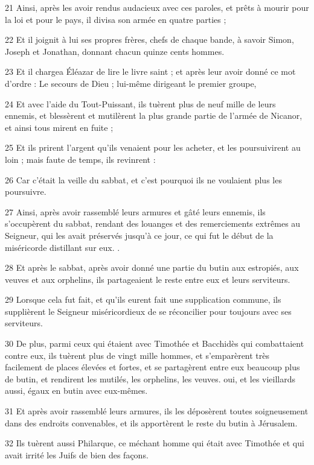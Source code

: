 \par 21 Ainsi, après les avoir rendus audacieux avec ces paroles, et prêts à mourir pour la loi et pour le pays, il divisa son armée en quatre parties ;
\par 22 Et il joignit à lui ses propres frères, chefs de chaque bande, à savoir Simon, Joseph et Jonathan, donnant chacun quinze cents hommes.
\par 23 Et il chargea Éléazar de lire le livre saint ; et après leur avoir donné ce mot d'ordre : Le secours de Dieu ; lui-même dirigeant le premier groupe,
\par 24 Et avec l'aide du Tout-Puissant, ils tuèrent plus de neuf mille de leurs ennemis, et blessèrent et mutilèrent la plus grande partie de l'armée de Nicanor, et ainsi tous mirent en fuite ;
\par 25 Et ils prirent l'argent qu'ils venaient pour les acheter, et les poursuivirent au loin ; mais faute de temps, ils revinrent :
\par 26 Car c'était la veille du sabbat, et c'est pourquoi ils ne voulaient plus les poursuivre.
\par 27 Ainsi, après avoir rassemblé leurs armures et gâté leurs ennemis, ils s'occupèrent du sabbat, rendant des louanges et des remerciements extrêmes au Seigneur, qui les avait préservés jusqu'à ce jour, ce qui fut le début de la miséricorde distillant sur eux. .
\par 28 Et après le sabbat, après avoir donné une partie du butin aux estropiés, aux veuves et aux orphelins, ils partageaient le reste entre eux et leurs serviteurs.
\par 29 Lorsque cela fut fait, et qu'ils eurent fait une supplication commune, ils supplièrent le Seigneur miséricordieux de se réconcilier pour toujours avec ses serviteurs.
\par 30 De plus, parmi ceux qui étaient avec Timothée et Bacchidès qui combattaient contre eux, ils tuèrent plus de vingt mille hommes, et s'emparèrent très facilement de places élevées et fortes, et se partagèrent entre eux beaucoup plus de butin, et rendirent les mutilés, les orphelins, les veuves. oui, et les vieillards aussi, égaux en butin avec eux-mêmes.
\par 31 Et après avoir rassemblé leurs armures, ils les déposèrent toutes soigneusement dans des endroits convenables, et ils apportèrent le reste du butin à Jérusalem.
\par 32 Ils tuèrent aussi Philarque, ce méchant homme qui était avec Timothée et qui avait irrité les Juifs de bien des façons.
